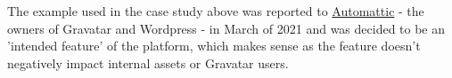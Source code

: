 The example used in the case study above was reported to \href{https://automattic.com/}{Automattic} - the owners of Gravatar and Wordpress -
            in March of 2021 and was decided to be an 'intended feature' of the platform, which makes sense as the feature doesn't negatively impact internal assets or Gravatar users.
